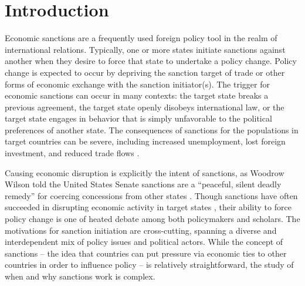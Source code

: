\section*{Introduction}
\label{intro}

Economic sanctions are a frequently used foreign policy tool in the realm of international relations. Typically, one or more states initiate sanctions against another when they desire to force that state to undertake a policy change. Policy change is expected to occur by depriving the sanction target of trade or other forms of economic exchange with the sanction initiator(s). The trigger for economic sanctions can occur in many contexts: the target state breaks a previous agreement, the target state openly disobeys international law, or the target state engages in behavior that is simply unfavorable to the political preferences of another state. The consequences of sanctions for the populations in target countries can be severe, including increased unemployment, lost foreign investment, and reduced trade flows \citep{hufbauer2003impact,hufbauer1997us}. 



Causing economic disruption is explicitly the intent of sanctions, as Woodrow Wilson told the United States Senate sanctions are a ``peaceful, silent deadly remedy'' for coercing concessions from other states \citep{foley23}. Though sanctions have often succeeded in disrupting economic activity in target states \citep{escriba2010dealing}, their ability to force policy change is one of heated debate among both policymakers and scholars. The motivations for sanction initiation are cross-cutting, spanning a diverse and interdependent mix of policy issues and political actors. While the concept of sanctions -- the idea that countries can put pressure via economic ties to other countries in order to influence policy -- is relatively straightforward, the study of when and why sanctions work is complex.


